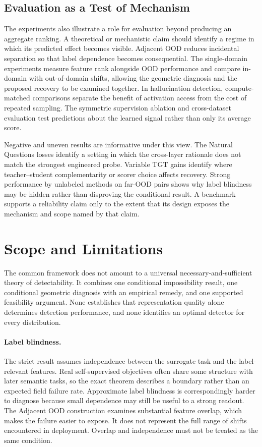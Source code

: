 \subsection{Evaluation as a Test of Mechanism}
\label{subsec:concl:eval}

The experiments also illustrate a role for evaluation beyond producing an aggregate
ranking. A theoretical or mechanistic claim should identify a regime in which its
predicted effect becomes visible. Adjacent OOD reduces incidental separation so
that label dependence becomes consequential. The single-domain experiments measure
feature rank alongside OOD performance and compare in-domain with out-of-domain
shifts, allowing the geometric diagnosis and the proposed recovery to be examined
together. In hallucination detection, compute-matched comparisons separate the
benefit of activation access from the cost of repeated sampling. The symmetric
supervision ablation and cross-dataset evaluation test predictions about the learned
signal rather than only its average score.

Negative and uneven results are informative under this view. The Natural Questions
losses identify a setting in which the cross-layer rationale does not match the
strongest engineered probe. Variable TGT gains identify where teacher--student
complementarity or scorer choice affects recovery. Strong performance by unlabeled
methods on far-OOD pairs shows why label blindness may be hidden rather than
disproving the conditional result. A benchmark supports a reliability claim only
to the extent that its design exposes the mechanism and scope named by that claim.

\section{Scope and Limitations}
\label{sec:concl:limitations}

The common framework does not amount to a universal necessary-and-sufficient theory
of detectability. It combines one conditional impossibility result, one conditional
geometric diagnosis with an empirical remedy, and one supported feasibility
argument. None establishes that representation quality alone determines detection
performance, and none identifies an optimal detector for every distribution.

\paragraph{Label blindness.}
The strict result assumes independence between the surrogate task and the
label-relevant features. Real self-supervised objectives often share some structure
with later semantic tasks, so the exact theorem describes a boundary rather than an
expected field failure rate. Approximate label blindness is correspondingly harder
to diagnose because small dependence may still be useful to a strong readout. The
Adjacent OOD construction examines substantial feature overlap, which makes the
failure easier to expose. It does not represent the full range of shifts encountered in
deployment. Overlap and independence must not be treated as the same condition.

